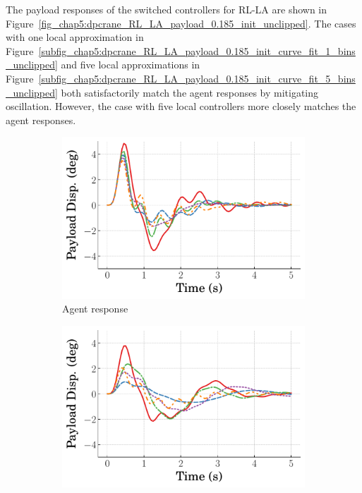 The payload responses of the switched controllers for RL-LA are shown in Figure~\ref{fig_chap5:dpcrane_RL_LA_payload_0.185_init_unclipped}.
The cases with one local approximation in Figure~\ref{subfig_chap5:dpcrane_RL_LA_payload_0.185_init_curve_fit_1_bins_unclipped} and five local approximations in Figure~\ref{subfig_chap5:dpcrane_RL_LA_payload_0.185_init_curve_fit_5_bins_unclipped} both satisfactorily match the agent responses by mitigating oscillation. However, the case with five local controllers more closely matches the agent responses.
%
\begin{figure}
    \centering
    \begin{subfigure}[b]{0.32\textwidth}
        \centering
        \includegraphics[width=\textwidth]{figures/figures_Interpretability/Mean_ISE_dpcrane_cubic_1_bins/curve_fit_time_responses/RL_LA/agent_0p18_Payload_Disp.pdf}
        \caption{Agent response}
        \label{subfig_chap5:dpcrane_RL_LA_payload_0.185_init_agent_unclipped}
    \end{subfigure}
    \hfill
    \begin{subfigure}[b]{0.32\textwidth}
        \centering
        \includegraphics[width=\textwidth]{figures/figures_Interpretability/Mean_ISE_dpcrane_cubic_1_bins/curve_fit_time_responses/RL_LA/curve_fit_0p18_Payload_Disp.pdf}

\end{subfigure}
\end{figure}
